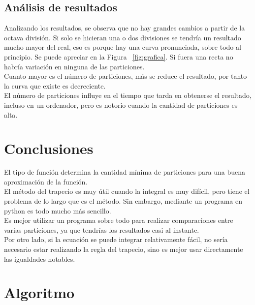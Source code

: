 \documentclass{article}
\begin{document}
    \subsection{Análisis de resultados}

     Analizando los resultados, se observa que no hay grandes cambios a partir de la octava división. Si solo se hicieran una o dos divisiones se tendría un resultado mucho mayor del real, eso es porque hay una curva pronunciada, sobre todo al principio. Se puede apreciar en la Figura ~\ref{fig:grafica}. Si fuera una recta no habría variación en ninguna de las particiones.\\

     Cuanto mayor es el número de particiones, más se reduce el resultado, por tanto la curva que existe es decreciente.\\

     El número de particiones influye en el tiempo que tarda en obtenerse el resultado, incluso en un ordenador, pero es notorio cuando la cantidad de particiones es alta.\\


    \pagebreak

   \section{Conclusiones}
    El tipo de función determina la cantidad mínima de particiones para una buena aproximación de la función.\\

    El método del trapecio es muy útil cuando la integral es muy difícil, pero tiene el problema de lo largo que es el método. Sin embargo, mediante un programa en python es todo mucho más sencillo.\\

    Es mejor utilizar un programa sobre todo para realizar comparaciones entre varias particiones, ya que tendrías los resultados casi al instante.\\

    Por otro lado, si la ecuación se puede integrar relativamente fácil, no sería necesario estar realizando la regla del trapecio, sino es mejor usar directamente las igualdades notables.\\

   \pagebreak

   \section{Algoritmo}
\end{document}
